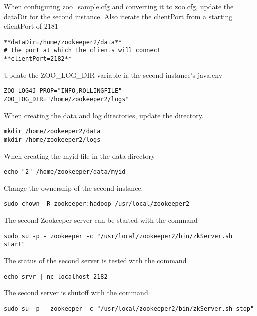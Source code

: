 When confuguring zoo\_sample.cfg and converting it to zoo.cfg, update
the dataDir for the second instance. Also iterate the clientPort from a
starting clientPort of 2181

\begin{lstlisting}
**dataDir=/home/zookeeper2/data**
# the port at which the clients will connect
**clientPort=2182**
\end{lstlisting}

Update the ZOO\_LOG\_DIR variable in the second instance's java.env

\begin{lstlisting}
ZOO_LOG4J_PROP="INFO,ROLLINGFILE"
ZOO_LOG_DIR="/home/zookeeper2/logs"
\end{lstlisting}

When creating the data and log directories, update the directory.

\begin{lstlisting}
mkdir /home/zookeeper2/data
mkdir /home/zookeeper2/logs 
\end{lstlisting}

When creating the myid file in the data directory

\begin{lstlisting}
echo "2" /home/zookeeper/data/myid
\end{lstlisting}

Change the ownership of the second instance.

\begin{lstlisting}
sudo chown -R zookeeper:hadoop /usr/local/zookeeper2
\end{lstlisting}

The second Zookeeper server can be started with the command

\begin{lstlisting}
sudo su -p - zookeeper -c "/usr/local/zookeeper2/bin/zkServer.sh start"
\end{lstlisting}

The status of the second server is tested with the command

\begin{lstlisting}
echo srvr | nc localhost 2182
\end{lstlisting}

The second server is shutoff with the command

\begin{lstlisting}
sudo su -p - zookeeper -c "/usr/local/zookeeper2/bin/zkServer.sh stop"
\end{lstlisting}

